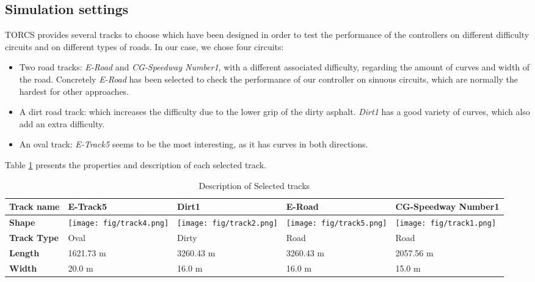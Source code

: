 \documentclass[runningheads,a4paper]{llncs}
\begin{document}
	
	\subsection{Simulation settings}
	
	TORCS provides several tracks to choose which have been designed in order to test the performance of the controllers on different difficulty circuits and on different types of roads.
	In our case, we chose four circuits:
	
	\begin{itemize}
		\item Two road tracks: \textit{E-Road} and \textit{CG-Speedway Number1}, with a different associated difficulty, regarding the amount of curves and width of the road. Concretely \textit{E-Road} has been selected to check the performance of our controller on sinuous circuits, which are normally the hardest for other approaches. 
		\item A dirt road track: which increases the difficulty due to the lower grip of the dirty asphalt. \textit{Dirt1} has a good variety of curves, which also add an extra difficulty.
		\item An oval track: \textit{E-Track5} seems to be the most interesting, as it has curves in both directions.
	\end{itemize}
	
	Table \ref{Tabtrack} presents the properties and description of each selected track.
	
	\begin{table}
		
		\caption{Description of Selected tracks}
		\label{Tabtrack}
		\begin{tabular}{ |p{2cm}|p{1.9 cm}|p{2.2 cm}|p{2.1 cm}|p{2.2 cm}|}
			\hline
			\textbf{Track name}    & E-Track5
			& Dirt1 
			& E-Road
			& CG-Speedway Number1
			\\
			\hline
			\textbf{Shape}   
			& \texttt{[image: fig/track4.png]}
			& \texttt{[image: fig/track2.png]}
			& \texttt{[image: fig/track5.png]}
			& \texttt{[image: fig/track1.png]}
			
			\\
			\hline
			\textbf{Track Type}   
			& Oval
			& Dirty
			& Road
			& Road
			
			\\
			\hline
			
			\textbf{Length}   
			& 1621.73 m
			& 3260.43 m
			& 3260.43 m
			& 2057.56 m
			
			\\
			\hline
			\textbf{Width}   
			& 20.0 m
			& 16.0 m
			& 16.0 m
			& 15.0 m
			\\
			\hline
		\end{tabular} 
		
	\end{table}
	
\end{document}
